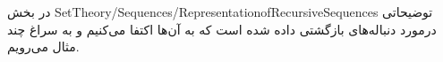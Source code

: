 
در بخش
SetTheory/Sequences/RepresentationofRecursiveSequences
توضیحاتی درمورد دنباله‌های بازگشتی داده شده است
که به آن‌ها اکتفا می‌کنیم
و به سراغ چند مثال می‌رویم.








